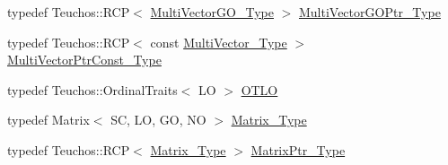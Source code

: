 \begin{DoxyCompactItemize}
typedef Teuchos\+::\+R\+CP$<$ \hyperlink{classFEDD_1_1RefinementFactory_a433fd79c1903a3771cffbaed6f5dbd71}{Multi\+Vector\+G\+O\+\_\+\+Type} $>$ \hyperlink{classFEDD_1_1RefinementFactory_a9e4318c3bc9a63b25f6283955ff80d49}{Multi\+Vector\+G\+O\+Ptr\+\_\+\+Type}
\item 
typedef Teuchos\+::\+R\+CP$<$ const \hyperlink{classFEDD_1_1RefinementFactory_af7c4cb285d95e61820d63b9344a90976}{Multi\+Vector\+\_\+\+Type} $>$ \hyperlink{classFEDD_1_1RefinementFactory_af904cdbfa726de22dcea9dfcc891114b}{Multi\+Vector\+Ptr\+Const\+\_\+\+Type}
\item 
typedef Teuchos\+::\+Ordinal\+Traits$<$ LO $>$ \hyperlink{classFEDD_1_1RefinementFactory_a266b4b5a15cabb39df492db6e4f53e3e}{O\+T\+LO}
\item 
typedef Matrix$<$ SC, LO, GO, NO $>$ \hyperlink{classFEDD_1_1RefinementFactory_ab04c3bb37b70c0524f46b050aaec1914}{Matrix\+\_\+\+Type}
\item 
typedef Teuchos\+::\+R\+CP$<$ \hyperlink{classFEDD_1_1RefinementFactory_ab04c3bb37b70c0524f46b050aaec1914}{Matrix\+\_\+\+Type} $>$ \hyperlink{classFEDD_1_1RefinementFactory_a52d5a6625f207bc4df2c5ae3362e8ced}{Matrix\+Ptr\+\_\+\+Type}
\end{DoxyCompactItemize}
